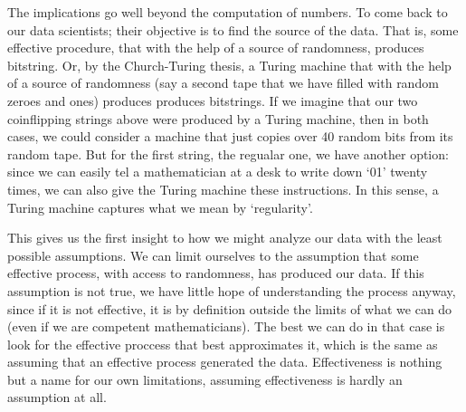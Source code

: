 The implications go well beyond the computation of numbers. To come back to our data scientists; their objective is to find the source of the data. That is, some effective procedure, that with the help of a source of randomness, produces bitstring. Or, by the Church-Turing thesis, a Turing machine that with the help of a source of randomness (say a second tape that we have filled with random zeroes and ones) produces produces bitstrings. If we imagine that our two coinflipping strings above were produced by a Turing machine, then in both cases, we could consider a machine that just copies over 40 random bits from its random tape. But for the first string, the regualar one, we have another option: since we can easily tel a mathematician at a desk to write down `01' twenty times, we can also give the Turing machine these instructions. In this sense, a Turing machine captures what we mean by `regularity'. 

This gives us the first insight to how we might analyze our data with the least possible assumptions. We can limit ourselves to the assumption that some effective process, with access to randomness, has produced our data. If this assumption is not true, we have little hope of understanding the process anyway, since if it is not effective, it is by definition outside the limits of what we can do (even if we are competent mathematicians). The best we can do in that case is look for the effective proccess that best approximates it, which is the same as assuming that an effective process generated the data. Effectiveness is nothing but a name for our own limitations, assuming effectiveness is hardly an assumption at all.

